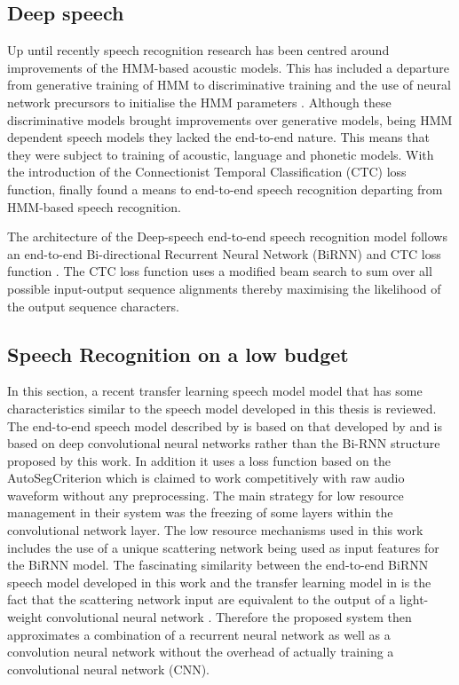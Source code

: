 \subsection{Deep speech}
Up until recently speech recognition research has been centred around improvements of the HMM-based acoustic models.  This has included a departure from generative training of HMM to discriminative training \citep{woodland2000large} and the use of neural network precursors to initialise the HMM parameters \citep{mohamed2012acoustic}.  Although these  discriminative models brought improvements over generative models, being HMM dependent speech models they lacked the end-to-end nature.  This means that they were subject to training of acoustic, language and phonetic models.  With the introduction of the Connectionist Temporal Classification (CTC) loss  function, \cite{graves2014towards} finally found a means to end-to-end speech recognition departing from HMM-based speech recognition. 

The architecture of the Deep-speech end-to-end speech recognition model \cite{hannun2014first} follows an end-to-end Bi-directional Recurrent Neural Network (BiRNN) and CTC loss function \citep{graves2006connectionist}.  The CTC loss function uses a modified beam search to sum over all possible input-output sequence alignments thereby maximising the likelihood of the output sequence characters.

\subsection{Speech Recognition on a low budget}

In this section, a recent transfer learning speech model model \citep{kunze2017transfer} that has some characteristics similar to the speech model developed in this thesis is reviewed.  The end-to-end speech model described by \cite{kunze2017transfer} is based on that developed by \cite{collobert2016wav2letter} and is based on deep convolutional neural networks rather than the Bi-RNN structure proposed by this work.  In addition it uses a loss function based on the AutoSegCriterion which is claimed to work competitively with raw audio waveform without any preprocessing.  The main strategy for low resource management in their system was the freezing of some layers within the convolutional network layer.  The low resource mechanisms used in this work includes the use of a unique scattering network being used as input features for the BiRNN model.  The fascinating similarity between the end-to-end BiRNN speech model developed in this work and the transfer learning model in \cite{kunze2017transfer} is the fact that the scattering network input are equivalent to the output of a light-weight convolutional neural network \cite{hannun2014first}.  Therefore the proposed system then approximates a combination of a recurrent neural network as well as a convolution neural network without the overhead of actually training a convolutional neural network (CNN).

